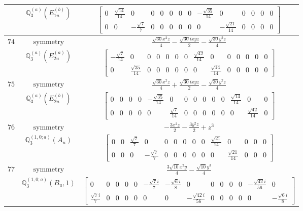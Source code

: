 \documentclass[fleqn,8pt,landscape]{jsarticle}
\begin{document}
\begin{longtable}{ccc}
$  $ & $ \mathbb{Q}_{3}^{(a)}(E_{1u}^{(b)}) $ & $ \begin{bmatrix} 0 & \frac{\sqrt{14}}{14} & 0 & 0 & 0 & 0 & 0 & 0 & - \frac{\sqrt{35}}{14} & 0 & 0 & 0 & 0 & 0 \\ 0 & 0 & - \frac{\sqrt{7}}{7} & 0 & 0 & 0 & 0 & 0 & 0 & - \frac{\sqrt{21}}{14} & 0 & 0 & 0 & 0 \end{bmatrix} $ \\ \hline
$ 74 $ & $ \text{symmetry} $ & $ \frac{\sqrt{30} x^{2} z}{4} - \frac{\sqrt{30} i x y z}{2} - \frac{\sqrt{30} y^{2} z}{4} $ \\
$  $ & $ \mathbb{Q}_{3}^{(a)}(E_{2u}^{(a)}) $ & $ \begin{bmatrix} - \frac{\sqrt{7}}{14} & 0 & 0 & 0 & 0 & 0 & 0 & \frac{\sqrt{42}}{14} & 0 & 0 & 0 & 0 & 0 & 0 \\ 0 & \frac{\sqrt{35}}{14} & 0 & 0 & 0 & 0 & 0 & 0 & \frac{\sqrt{14}}{14} & 0 & 0 & 0 & 0 & 0 \end{bmatrix} $ \\ \hline
$ 75 $ & $ \text{symmetry} $ & $ \frac{\sqrt{30} x^{2} z}{4} + \frac{\sqrt{30} i x y z}{2} - \frac{\sqrt{30} y^{2} z}{4} $ \\
$  $ & $ \mathbb{Q}_{3}^{(a)}(E_{2u}^{(b)}) $ & $ \begin{bmatrix} 0 & 0 & 0 & 0 & - \frac{\sqrt{35}}{14} & 0 & 0 & 0 & 0 & 0 & 0 & \frac{\sqrt{14}}{14} & 0 & 0 \\ 0 & 0 & 0 & 0 & 0 & \frac{\sqrt{7}}{14} & 0 & 0 & 0 & 0 & 0 & 0 & \frac{\sqrt{42}}{14} & 0 \end{bmatrix} $ \\ \hline
$ 76 $ & $ \text{symmetry} $ & $ - \frac{3 x^{2} z}{2} - \frac{3 y^{2} z}{2} + z^{3} $ \\
$  $ & $ \mathbb{Q}_{3}^{(1,0;a)}(A_{u}) $ & $ \begin{bmatrix} 0 & 0 & \frac{\sqrt{7}}{7} & 0 & 0 & 0 & 0 & 0 & 0 & \frac{\sqrt{21}}{14} & 0 & 0 & 0 & 0 \\ 0 & 0 & 0 & - \frac{\sqrt{7}}{7} & 0 & 0 & 0 & 0 & 0 & 0 & \frac{\sqrt{21}}{14} & 0 & 0 & 0 \end{bmatrix} $ \\ \hline
$ 77 $ & $ \text{symmetry} $ & $ \frac{3 \sqrt{10} x^{2} y}{4} - \frac{\sqrt{10} y^{3}}{4} $ \\
$  $ & $ \mathbb{Q}_{3}^{(1,0;a)}(B_{u},1) $ & $ \begin{bmatrix} 0 & 0 & 0 & 0 & 0 & - \frac{\sqrt{7} i}{7} & - \frac{\sqrt{6} i}{8} & 0 & 0 & 0 & 0 & 0 & - \frac{\sqrt{42} i}{56} & 0 \\ \frac{\sqrt{7} i}{7} & 0 & 0 & 0 & 0 & 0 & 0 & - \frac{\sqrt{42} i}{56} & 0 & 0 & 0 & 0 & 0 & - \frac{\sqrt{6} i}{8} \end{bmatrix} $ \\ \hline

\end{longtable}
\end{document}
